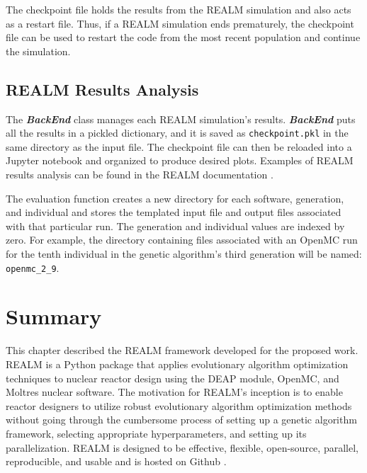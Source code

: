 The checkpoint file holds the results from the \gls{REALM} simulation and also acts 
as a restart file. 
Thus, if a \gls{REALM} simulation ends prematurely, the checkpoint file can be used 
to restart the code from the most recent population and continue the simulation. 

\subsection{REALM Results Analysis}
The \textbf{\textit{BackEnd}} class manages each \gls{REALM} simulation's results. 
\textbf{\textit{BackEnd}} puts all the results in a pickled dictionary, and it 
is saved as \texttt{checkpoint.pkl} in the same directory as the input file. 
The checkpoint file can then be reloaded into a Jupyter notebook and organized 
to produce desired plots. 
Examples of \gls{REALM} results analysis can be found in the \gls{REALM} documentation 
\cite{chee_arfcrealm_2021}. 

The evaluation function creates a new directory for each software, generation, 
and individual and stores the templated input file and output files associated 
with that particular run. 
The generation and individual values are indexed by zero. 
For example, the directory containing files associated with an OpenMC run for 
the tenth individual in the genetic algorithm's third generation will be named: 
\texttt{openmc\_2\_9}.




\section{Summary}
This chapter described the \acrfull{REALM} framework developed for the
proposed work. 
\gls{REALM} is a Python package that applies evolutionary algorithm 
optimization techniques to nuclear reactor design using the \acrfull{DEAP} 
module, OpenMC, and Moltres nuclear software. 
The motivation for \gls{REALM}'s inception is to enable reactor designers to utilize 
robust evolutionary algorithm optimization methods without going 
through the cumbersome process of setting up a genetic algorithm framework,
selecting appropriate hyperparameters, and setting up its parallelization. 
REALM is designed to be effective, flexible, open-source, parallel, 
reproducible, and usable and is hosted on Github \cite{chee_arfcrealm_2021}. 